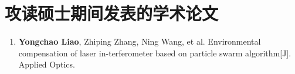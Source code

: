 





\chapter*{攻读硕士期间发表的学术论文}
\begin{enumerate}
  \renewcommand{\labelenumi}{[\theenumi].}
  \item \textbf{Yongchao Liao}, Zhiping Zhang, Ning Wang, et al. Environmental compensation of laser in-terferometer based on particle swarm algorithm[J]. Applied Optics.
  \end{enumerate}


